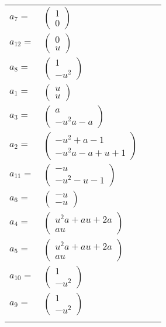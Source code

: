 \documentclass[1p]{elsarticle_modified}
\theoremstyle{definition}
\begin{document}
\begin{tabular}{m{7pt} m{180pt} m{7pt} m{180pt} }
\flushright $a_{7}=$&$\begin{pmatrix}1\\0\end{pmatrix}$ \\
\flushright $a_{12}=$&$\begin{pmatrix}0\\u\end{pmatrix}$ \\
\flushright $a_{8}=$&$\begin{pmatrix}1\\- u^2\end{pmatrix}$ \\
\flushright $a_{1}=$&$\begin{pmatrix}u\\u\end{pmatrix}$ \\
\flushright $a_{3}=$&$\begin{pmatrix}a\\- u^2 a- a\end{pmatrix}$ \\
\flushright $a_{2}=$&$\begin{pmatrix}- u^2+a-1\\- u^2 a- a+u+1\end{pmatrix}$ \\
\flushright $a_{11}=$&$\begin{pmatrix}- u\\- u^2- u-1\end{pmatrix}$ \\
\flushright $a_{6}=$&$\begin{pmatrix}- u\\- u\end{pmatrix}$ \\
\flushright $a_{4}=$&$\begin{pmatrix}u^2 a+a u+2 a\\a u\end{pmatrix}$ \\
\flushright $a_{5}=$&$\begin{pmatrix}u^2 a+a u+2 a\\a u\end{pmatrix}$ \\
\flushright $a_{10}=$&$\begin{pmatrix}1\\- u^2\end{pmatrix}$ \\
\flushright $a_{9}=$&$\begin{pmatrix}1\\- u^2\end{pmatrix}$\\&\end{tabular}
\end{document}
